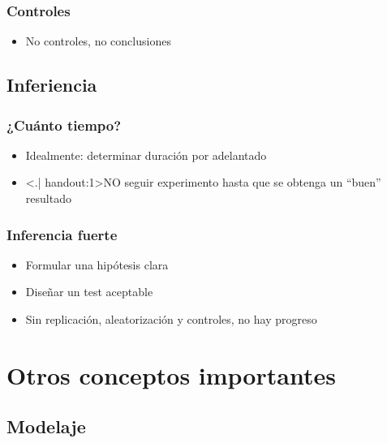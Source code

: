 \documentclass[mathserif]{beamer}
\begin{document}
\begin{frame}[label=control]
\frametitle{Controles}
 \begin{itemize}
   \item No controles, no conclusiones
\end{itemize}
\end{frame}%


\subsection[Inferiencia]{Inferiencia}

\begin{frame}[label=howlong]
   \frametitle{¿Cu\'anto tiempo?}
   \begin{itemize}[<+-| handout:1>]
      \item Idealmente: determinar duraci\'on por adelantado 
      \item \alert<.| handout:1>{NO} seguir experimento hasta que se obtenga un ``buen'' resultado
   \end{itemize}
\end{frame}%


\begin{frame}[label=stronginfer]
   \frametitle{Inferencia fuerte}
   \begin{itemize}
      \item Formular una hip\'otesis clara
      \item Dise\~nar un test aceptable
      \medskip
      \item Sin replicaci\'on, aleatorizaci\'on y controles, no hay progreso
   \end{itemize}
\end{frame}%





\section[Otros conceptos]{Otros conceptos importantes}

\subsection[Modelaje]{Modelaje}
\end{document}
